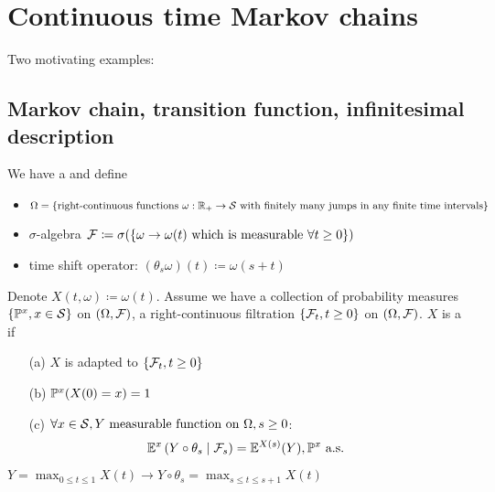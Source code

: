 \chapter{Continuous time Markov chains}

Two motivating examples:


\section{Markov chain, transition function, infinitesimal description}

We have a  and define
\begin{itemize}
    \item \(\Omega=\{\text{right-continuous functions }\omega:\mathbb{R}_+\to\mathcal{S} \text{ with finitely many jumps in any finite time intervals}\}\) 
    \item \(\sigma\)-algebra \(\mathcal{F}\coloneqq \sigma(\{\omega\to\omega(t)\text{ which is measurable }\forall t\geq 0\})\)
    \item time shift operator: \((\theta_s \omega)(t)\coloneqq \omega(s+t)\)
\end{itemize}

\begin{definition}\label{def:1.1}
    Denote \(X(t,\omega)\coloneqq \omega(t)\). 
    Assume we have a collection of probability measures \(\{\mathbb{P}^x,x\in\mathcal{S}\}\) on \((\Omega,\mathcal{F})\),
    a right-continuous filtration \(\{\mathcal{F}_t,t\geq 0\}\) on \((\Omega,\mathcal{F})\). 
    \(X\) is a  if 
    \begin{enumerate}
        \item[(a)] \(X\) is adapted to \(\{\mathcal{F}_t,t\geq 0\}\)
        \item[(b)]  \(\mathbb{P}^x(X(0)=x)=1\)
        \item[(c)]  \(\forall x\in \mathcal{S},Y \text{ measurable function on }\Omega,s\geq 0\):\[\mathbb{E}^x\left(Y\circ \theta_s\mid \mathcal{F}_s\right)=\mathbb{E}^{X(s)}(Y), \mathbb{P}^x \text{ a.s. }\]   
    \end{enumerate}

\end{definition}

\begin{example*}
    \(Y=\max_{0\leq t\leq 1} X(t)\to Y\circ \theta_s = \max_{s\leq t\leq s+1} X(t)\)
\end{example*}

